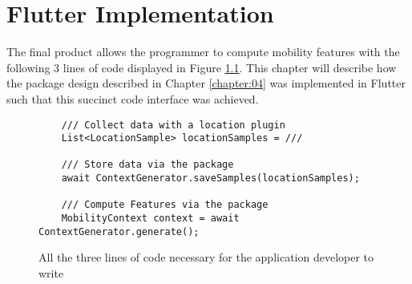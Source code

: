 \chapter{Flutter Implementation}
\label{chapter:05}
The final product allows the programmer to compute mobility features with the following 3 lines of code displayed in Figure \ref{fig:code-example-intro}. This chapter will describe how the package design described in Chapter \ref{chapter:04} was implemented in Flutter such that this succinct code interface was achieved.

\begin{figure}[h]
    \centering
    \begin{verbatim}
    /// Collect data with a location plugin
    List<LocationSample> locationSamples = ///

    /// Store data via the package
    await ContextGenerator.saveSamples(locationSamples);
    
    /// Compute Features via the package
    MobilityContext context = await ContextGenerator.generate();
    \end{verbatim}
    \caption{All the three lines of code necessary for the application developer to write}
    \label{fig:code-example-intro}
\end{figure}









